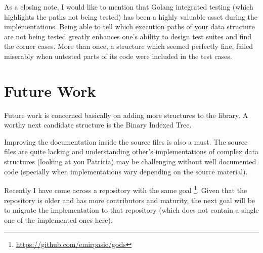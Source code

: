 \documentclass[a4paper,10pt,table,xcdraw]{article}
\begin{document}
As a closing note, I would like to mention that Golang integrated testing (which highlights the paths not being tested) has been a highly valuable asset during the implementations. Being able to tell which execution paths of your data structure are not being tested greatly enhances one's ability to design test suites and find the corner cases. More than once, a structure which seemed perfectly fine, failed miserably when untested parts of its code were included in the test cases.



\section{Future Work}
\label{sec:future}

Future work is concerned basically on adding more structures to the library. A worthy next candidate structure is the Binary Indexed Tree.

Improving the documentation inside the source files is also a must. The source files are quite lacking and understanding other's implementations of complex data structures (looking at you Patricia) may be challenging without well documented code (specially when implementations vary depending on the source material).

Recently I have come across a repository with the same goal \footnote{ \url{https://github.com/emirpasic/gods}}. Given that the repository is older and has more contributors and maturity, the next goal will be to migrate the implementation to that repository (which does not contain a single one of the implemented ones here).







 

\end{document}
